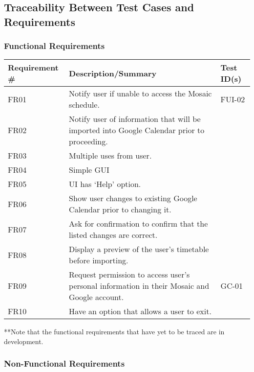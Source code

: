 \documentclass[12pt, titlepage]{article}
\begin{document}
\subsection{Traceability Between Test Cases and Requirements}

\subsubsection{Functional Requirements}
\begin{tabular}{ |p{3cm}|p{8cm}|p{2cm}| }
\hline Requirement \#  &Description/Summary& Test ID(s) \\
\toprule
FR01 & Notify user if unable to access the Mosaic schedule. & FUI-02 \\
FR02 & Notify user of information that will be imported into Google Calendar prior to proceeding. & \\
FR03 & Multiple uses from user. &\\
FR04 & Simple GUI & \\
FR05 & UI has ‘Help’ option. & \\
FR06 & Show user changes to existing Google Calendar prior to changing it. & \\
FR07 & Ask for confirmation to confirm that the listed changes are correct. & \\
FR08 & Display a preview of the user’s timetable before importing. & \\
FR09 & Request permission to access user’s personal information in their Mosaic and Google account. & GC-01\\
FR10 & Have an option that allows a user to exit. & \\
\bottomrule
\end{tabular}
\caption{**Note that the functional requirements that have yet to be traced are in development.}
\subsubsection{Non-Functional Requirements}
\end{document}

